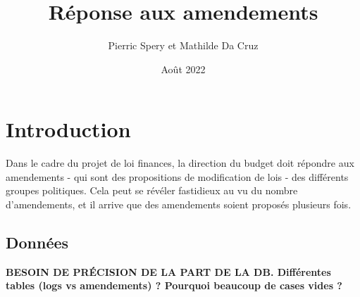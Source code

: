 \documentclass{article}
\title{Réponse aux amendements}
\author{Pierric Spery et Mathilde Da Cruz}
\date{Août 2022}
\begin{document}
\maketitle
\section{Introduction}
Dans le cadre du projet de loi finances, la direction du budget doit répondre aux amendements - qui sont des propositions de modification de lois - des différents groupes politiques. Cela peut se révéler fastidieux au vu du nombre d'amendements, et il arrive que des amendements soient proposés plusieurs fois.

\subsection{Données}
\textbf{BESOIN DE PRÉCISION DE LA PART DE LA DB. Différentes tables (logs vs amendements) ? Pourquoi beaucoup de cases vides ?}
\\
\end{document}
